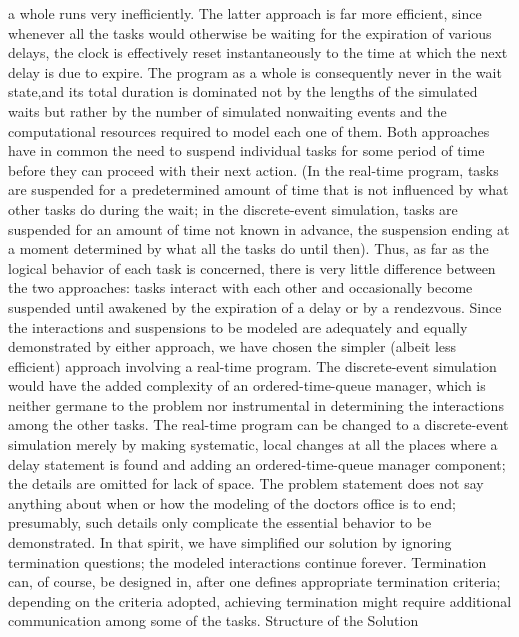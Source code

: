 a whole runs very inefficiently. The latter approach is far more efficient,
since whenever all the tasks would otherwise be waiting for the expiration
of various delays, the clock is effectively reset instantaneously
to the time at which the next delay is due to expire. The program
as a whole is consequently never in the \ldquo[]wait state,\rdquo[]
and its total duration is dominated not by the lengths of the simulated
waits but rather by the number of simulated nonwaiting events and
the computational resources required to model each one of them.%
\Endpara[]
\Para[]Both approaches have in common the need to suspend individual
tasks for some period of time before they can proceed with their next
action. (In the real-time program, tasks are suspended for a predetermined
amount of time that is not influenced by what other tasks do during
the wait; in the discrete-event simulation, tasks are suspended for
an amount of time not known in advance, the suspension ending at a
moment determined by what all the tasks do until then). Thus, as far
as the logical behavior of each task is concerned, there is very little
difference between the two approaches: tasks interact with each other
and occasionally become suspended until awakened by the expiration
of a delay or by a rendezvous. Since the interactions and suspensions
to be modeled are adequately and equally demonstrated by either approach,
we have chosen the simpler (albeit less efficient) approach involving
a real-time program. The discrete-event simulation would have the
added complexity of an ordered-time-queue manager, which is neither
germane to the problem nor instrumental in determining the interactions
among the other tasks. The real-time program can be changed to a discrete-event
simulation merely by making systematic, local changes at all the places
where a delay statement is found and adding an ordered-time-queue
manager component; the details are omitted for lack of space.%
\Endpara[]
\Para[]The problem statement does not say anything about when or how
the modeling of the doctor\rsquo[]s office is to end; presumably,
such details only complicate the essential behavior to be demonstrated.
In that spirit, we have simplified our solution by ignoring termination
questions; the modeled interactions continue forever. Termination
can, of course, be designed in, after one defines appropriate termination
criteria; depending on the criteria adopted, achieving termination
might require additional communication among some of the tasks.%
\Endpara[]
\DivEndiv[]
\DivLiv[]\HdMinLiv[]Structure of the Solution\HdMinEndiv[]
